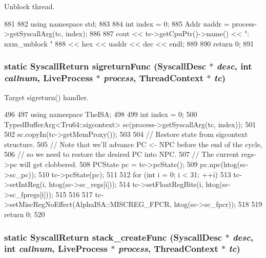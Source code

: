 Unblock thread. 


\begin{DoxyCode}
881     {
882         using namespace std;
883 
884         int index = 0;
885         Addr uaddr = process->getSyscallArg(tc, index);
886 
887         cout << tc->getCpuPtr()->name() << ": nxm_unblock "
888              << hex << uaddr << dec << endl;
889 
890         return 0;
891     }
\end{DoxyCode}
\hypertarget{classTru64_a368f998d81d17c06f2fb1639683f8302}{
\subsubsection[{sigreturnFunc}]{\setlength{\rightskip}{0pt plus 5cm}static {\bf SyscallReturn} sigreturnFunc ({\bf SyscallDesc} $\ast$ {\em desc}, \/  int {\em callnum}, \/  {\bf LiveProcess} $\ast$ {\em process}, \/  {\bf ThreadContext} $\ast$ {\em tc})}}
\label{classTru64_a368f998d81d17c06f2fb1639683f8302}


Target sigreturn() handler. 


\begin{DoxyCode}
496     {
497         using namespace TheISA;
498 
499         int index = 0;
500         TypedBufferArg<Tru64::sigcontext> sc(process->getSyscallArg(tc, index));
501 
502         sc.copyIn(tc->getMemProxy());
503 
504         // Restore state from sigcontext structure.
505         // Note that we'll advance PC <- NPC before the end of the cycle,
506         // so we need to restore the desired PC into NPC.
507         // The current regs->pc will get clobbered.
508         PCState pc = tc->pcState();
509         pc.npc(htog(sc->sc_pc));
510         tc->pcState(pc);
511 
512         for (int i = 0; i < 31; ++i) {
513             tc->setIntReg(i, htog(sc->sc_regs[i]));
514             tc->setFloatRegBits(i, htog(sc->sc_fpregs[i]));
515         }
516 
517         tc->setMiscRegNoEffect(AlphaISA::MISCREG_FPCR, htog(sc->sc_fpcr));
518 
519         return 0;
520     }
\end{DoxyCode}
\hypertarget{classTru64_ac6e3676ee42b0ad6a609f36f0cf654bb}{
\subsubsection[{stack\_\-createFunc}]{\setlength{\rightskip}{0pt plus 5cm}static {\bf SyscallReturn} stack\_\-createFunc ({\bf SyscallDesc} $\ast$ {\em desc}, \/  int {\em callnum}, \/  {\bf LiveProcess} $\ast$ {\em process}, \/  {\bf ThreadContext} $\ast$ {\em tc})}}
\label{classTru64_ac6e3676ee42b0ad6a609f36f0cf654bb}


